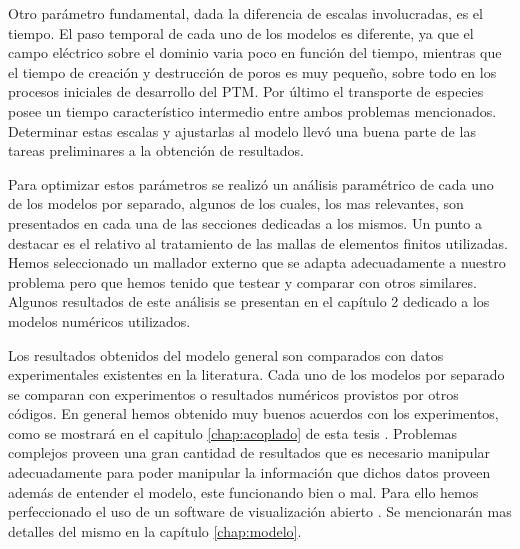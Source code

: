 Otro parámetro fundamental, dada la diferencia de escalas involucradas, es el tiempo. El paso temporal de cada uno de los modelos es diferente, ya que el campo eléctrico sobre el dominio varia poco en función del tiempo, mientras que el tiempo de creación y destrucción de poros es muy pequeño, sobre todo en los procesos iniciales de desarrollo del PTM. Por último el transporte de especies posee un tiempo característico intermedio entre ambos problemas mencionados. Determinar estas escalas y ajustarlas al modelo llevó una buena parte de las tareas preliminares a la obtención de resultados.

Para optimizar estos parámetros se realizó un análisis paramétrico de cada uno de los modelos por separado, algunos de los cuales, los mas relevantes, son presentados en cada una de las secciones dedicadas a los mismos. 
Un punto a destacar es el relativo al tratamiento de las mallas de elementos finitos utilizadas. Hemos seleccionado un mallador externo \cite{automesh} que se adapta adecuadamente a nuestro problema pero que hemos tenido que testear y comparar con otros similares. Algunos resultados de este análisis se presentan en el capítulo 2 dedicado a los modelos numéricos utilizados.

Los resultados obtenidos del modelo general son comparados con datos experimentales existentes en la literatura. Cada uno de los modelos por separado se comparan con experimentos o resultados numéricos provistos por otros códigos. En general hemos obtenido muy buenos acuerdos con los experimentos, como se mostrará en el capitulo \ref{chap:acoplado} de esta tesis \cite{c6-fodava, krass07, c8}. Problemas complejos proveen una gran cantidad de resultados que es necesario manipular adecuadamente para poder manipular la información que dichos datos proveen además de entender el modelo, este funcionando bien o mal. Para ello hemos perfeccionado el uso de un software de visualización abierto \cite{c16}. Se mencionarán mas detalles del mismo en la capítulo \ref{chap:modelo}.


